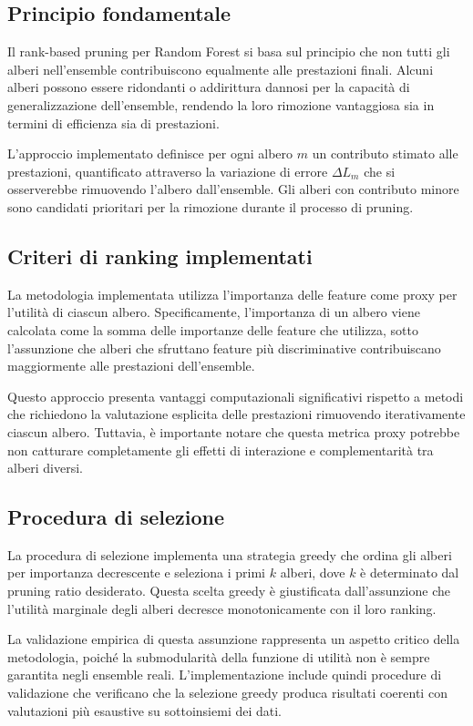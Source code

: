 \documentclass[a4paper,12pt]{report}
\begin{document}
	\subsection{Principio fondamentale}
	Il rank-based pruning per Random Forest si basa sul principio che non tutti gli alberi nell'ensemble contribuiscono equalmente alle prestazioni finali. Alcuni alberi possono essere ridondanti o addirittura dannosi per la capacità di generalizzazione dell'ensemble, rendendo la loro rimozione vantaggiosa sia in termini di efficienza sia di prestazioni.
	
	L'approccio implementato definisce per ogni albero $m$ un contributo stimato alle prestazioni, quantificato attraverso la variazione di errore $\Delta L_m$ che si osserverebbe rimuovendo l'albero dall'ensemble. Gli alberi con contributo minore sono candidati prioritari per la rimozione durante il processo di pruning.
	
	\subsection{Criteri di ranking implementati}
	La metodologia implementata utilizza l'importanza delle feature come proxy per l'utilità di ciascun albero. Specificamente, l'importanza di un albero viene calcolata come la somma delle importanze delle feature che utilizza, sotto l'assunzione che alberi che sfruttano feature più discriminative contribuiscano maggiormente alle prestazioni dell'ensemble.
	
	Questo approccio presenta vantaggi computazionali significativi rispetto a metodi che richiedono la valutazione esplicita delle prestazioni rimuovendo iterativamente ciascun albero. Tuttavia, è importante notare che questa metrica proxy potrebbe non catturare completamente gli effetti di interazione e complementarità tra alberi diversi.
	
	\subsection{Procedura di selezione}
	La procedura di selezione implementa una strategia greedy che ordina gli alberi per importanza decrescente e seleziona i primi $k$ alberi, dove $k$ è determinato dal pruning ratio desiderato. Questa scelta greedy è giustificata dall'assunzione che l'utilità marginale degli alberi decresce monotonicamente con il loro ranking.
	
	La validazione empirica di questa assunzione rappresenta un aspetto critico della metodologia, poiché la submodularità della funzione di utilità non è sempre garantita negli ensemble reali. L'implementazione include quindi procedure di validazione che verificano che la selezione greedy produca risultati coerenti con valutazioni più esaustive su sottoinsiemi dei dati.
	
\end{document}
